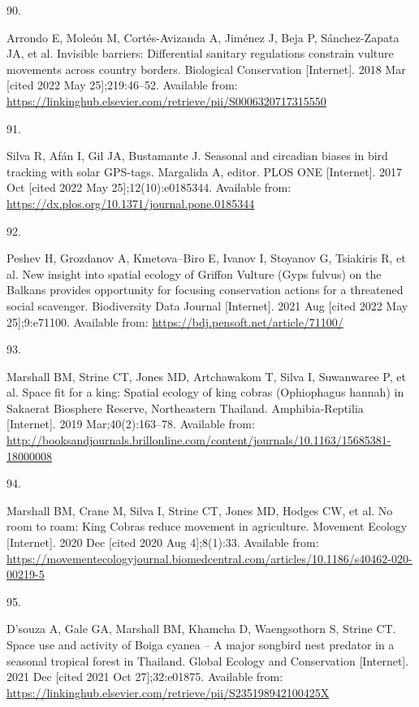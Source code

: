 \documentclass[10pt,a4paper]{article}
\newlength{\cslhangindent}
\newlength{\csllabelwidth}
\newlength{\cslentryspacingunit} %
\newenvironment{CSLReferences}[2] %
 {%
  \setlength{\parindent}{0pt}
  \ifodd #1
  \let\oldpar\par
  \def\par{\hangindent=\cslhangindent\oldpar}
  \fi
  \setlength{\parskip}{#2\cslentryspacingunit}
 }%
 {}
\newcommand{\CSLLeftMargin}[1]{\parbox[t]{\csllabelwidth}{#1}}
\newcommand{\CSLRightInline}[1]{\parbox[t]{\linewidth - \csllabelwidth}{#1}\break}
\begin{document}
\begin{CSLReferences}{0}{0}
\leavevmode{}%
\CSLLeftMargin{90. }
\CSLRightInline{Arrondo E, Moleón M, Cortés-Avizanda A, Jiménez J, Beja P, Sánchez-Zapata JA, et al. Invisible barriers: {Differential} sanitary regulations constrain vulture movements across country borders. Biological Conservation {[}Internet{]}. 2018 Mar {[}cited 2022 May 25{]};219:46--52. Available from: \url{https://linkinghub.elsevier.com/retrieve/pii/S0006320717315550}}

\leavevmode{}%
\CSLLeftMargin{91. }
\CSLRightInline{Silva R, Afán I, Gil JA, Bustamante J. Seasonal and circadian biases in bird tracking with solar {GPS}-tags. Margalida A, editor. PLOS ONE {[}Internet{]}. 2017 Oct {[}cited 2022 May 25{]};12(10):e0185344. Available from: \url{https://dx.plos.org/10.1371/journal.pone.0185344}}

\leavevmode{}%
\CSLLeftMargin{92. }
\CSLRightInline{Peshev H, Grozdanov A, Kmetova--Biro E, Ivanov I, Stoyanov G, Tsiakiris R, et al. New insight into spatial ecology of {Griffon} {Vulture} ({Gyps} fulvus) on the {Balkans} provides opportunity for focusing conservation actions for a threatened social scavenger. Biodiversity Data Journal {[}Internet{]}. 2021 Aug {[}cited 2022 May 25{]};9:e71100. Available from: \url{https://bdj.pensoft.net/article/71100/}}

\leavevmode{}%
\CSLLeftMargin{93. }
\CSLRightInline{Marshall BM, Strine CT, Jones MD, Artchawakom T, Silva I, Suwanwaree P, et al. Space fit for a king: Spatial ecology of king cobras ({Ophiophagus} hannah) in {Sakaerat} {Biosphere} {Reserve}, {Northeastern} {Thailand}. Amphibia-Reptilia {[}Internet{]}. 2019 Mar;40(2):163--78. Available from: \url{http://booksandjournals.brillonline.com/content/journals/10.1163/15685381-18000008}}

\leavevmode{}%
\CSLLeftMargin{94. }
\CSLRightInline{Marshall BM, Crane M, Silva I, Strine CT, Jones MD, Hodges CW, et al. No room to roam: {King} {Cobras} reduce movement in agriculture. Movement Ecology {[}Internet{]}. 2020 Dec {[}cited 2020 Aug 4{]};8(1):33. Available from: \url{https://movementecologyjournal.biomedcentral.com/articles/10.1186/s40462-020-00219-5}}

\leavevmode{}%
\CSLLeftMargin{95. }
\CSLRightInline{D'souza A, Gale GA, Marshall BM, Khamcha D, Waengsothorn S, Strine CT. Space use and activity of {Boiga} cyanea -- {A} major songbird nest predator in a seasonal tropical forest in {Thailand}. Global Ecology and Conservation {[}Internet{]}. 2021 Dec {[}cited 2021 Oct 27{]};32:e01875. Available from: \url{https://linkinghub.elsevier.com/retrieve/pii/S235198942100425X}}


\end{CSLReferences}
\end{document}
